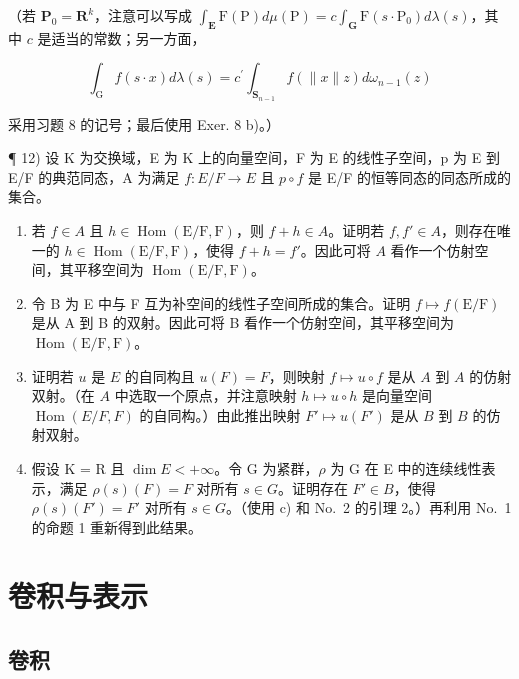 （若 \(\mathbf{P}_0 = \mathbf{R}^k\)，注意可以写成 \(\int_{\mathbf{E}} \mathrm{F}(\mathrm{P}) d\mu(\mathrm{P}) = c \int_{\mathbf{G}} \mathrm{F}(s \cdot \mathrm{P}_0) d\lambda(s)\)，其中 \(c\) 是适当的常数；另一方面，

\[
\int_ {\mathrm{G}} f (s \cdot x) d \lambda (s) = c ^ {\prime} \int_ {\mathbf {S} _ {n - 1}} f (\| x \| z) d \omega_ {n - 1} (z)
\]

采用习题 8 的记号；最后使用 Exer. 8 b)。）

¶ 12) 设 K 为交换域，E 为 K 上的向量空间，F 为 E 的线性子空间，p 为 E 到 E/F 的典范同态，A 为满足 \(f: E/F \to E\) 且 \(p \circ f\) 是 E/F 的恒等同态的同态所成的集合。

\begin{enumerate}
\def\labelenumi{\alph{enumi})}
\item
  若 \(f \in A\) 且 \(h \in \operatorname{Hom}(\mathrm{E} / \mathrm{F}, \mathrm{F})\)，则 \(f + h \in A\)。证明若 \(f, f' \in A\)，则存在唯一的 \(h \in \operatorname{Hom}(\mathrm{E} / \mathrm{F}, \mathrm{F})\)，使得 \(f + h = f'\)。因此可将 \(A\) 看作一个仿射空间，其平移空间为 \(\operatorname{Hom}(\mathrm{E} / \mathrm{F}, \mathrm{F})\)。
\item
  令 B 为 E 中与 F 互为补空间的线性子空间所成的集合。证明 \(f \mapsto f(\mathrm{E}/\mathrm{F})\) 是从 A 到 B 的双射。因此可将 B 看作一个仿射空间，其平移空间为 \(\operatorname{Hom}(\mathrm{E}/\mathrm{F}, \mathrm{F})\)。
\item
  证明若 \(u\) 是 \(E\) 的自同构且 \(u(F) = F\)，则映射 \(f \mapsto u \circ f\) 是从 \(A\) 到 \(A\) 的仿射双射。（在 \(A\) 中选取一个原点，并注意映射 \(h \mapsto u \circ h\) 是向量空间 \(\operatorname{Hom}(E/F, F)\) 的自同构。）由此推出映射 \(F' \mapsto u(F')\) 是从 \(B\) 到 \(B\) 的仿射双射。
\item
  假设 K = R 且 \(\dim E < +\infty\)。令 G 为紧群，\(\rho\) 为 G 在 E 中的连续线性表示，满足 \(\rho(s)(F) = F\) 对所有 \(s \in G\)。证明存在 \(F' \in B\)，使得 \(\rho(s)(F') = F'\) 对所有 \(s \in G\)。（使用 c) 和 No.~2 的引理 2。）再利用 No.~1 的命题 1 重新得到此结果。
\end{enumerate}

\chapter{卷积与表示}

\section{卷积}

